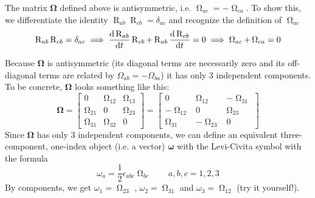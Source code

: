 \documentclass[11pt, a4paper]{article}
\newcommand{\mat}[1]{\mathbf{#1}} %
\begin{document}
\begin{itemize}
	The matrix $ \mathbf{\Omega} $ defined above is antisymmetric, i.e. $ \operatorname{\Omega}_{ac} = - \operatorname{\Omega}_{ca} $. To show this, we differentiate the identity $ \operatorname{R}_{ab}\operatorname{R}_{cb} = \delta_{a c} $ and recognize the definition of $ \operatorname{\Omega}_{ac} $
	\begin{equation*}
		\operatorname{R}_{ab}\operatorname{R}_{cb} = \delta_{a c} \implies \dv{\operatorname{R}_{ab}}{t}\operatorname{R}_{cb} + \operatorname{R}_{ab}\dv{\operatorname{R}_{cb}}{t} = 0 \implies \operatorname{\Omega}_{ac} + \operatorname{\Omega}_{ca} = 0
	\end{equation*}
	
	Because $ \mat{\Omega} $ is antisymmetric (its diagonal terms are necessarily zero and its off-diagonal terms are related by $ \Omega_{ab} = - \Omega_{ba} $) it has only 3 independent components. To be concrete, $ \mat{\Omega} $ looks something like this:
	\begin{equation*}
		\mat{\Omega} = 
		\begin{bmatrix}
			0 & \operatorname{\Omega}_{12} & \operatorname{\Omega}_{13}\\
			\operatorname{\Omega}_{21} & 0 & \operatorname{\Omega}_{23}\\
			\operatorname{\Omega}_{31} & \operatorname{\Omega}_{32} & 0
		\end{bmatrix}
		= 
		\begin{bmatrix}
			0 & \operatorname{\Omega}_{12} & - \operatorname{\Omega}_{31}\\-
			\operatorname{\Omega}_{12} & 0 & \operatorname{\Omega}_{23}\\
			\operatorname{\Omega}_{31} & -\operatorname{\Omega}_{23} & 0
		\end{bmatrix}
	\end{equation*}
	Since $ \mat{\Omega} $ has only 3 independent components, we can define an equivalent three-component, one-index object (i.e. a vector) $ \bm{\omega} $ with the Levi-Civita symbol with the formula
	\begin{equation*}
		 \omega_{a} = \frac{1}{2} \epsilon_{abc} \operatorname{\Omega}_{bc} \qquad a, b, c = 1, 2, 3
	\end{equation*}
	By components, we get $ \omega_{1} = \operatorname{\Omega}_{23}$ , $ \omega_{2} = \operatorname{\Omega}_{31} $ and $ \omega_{3} = \operatorname{\Omega}_{12} $ (try it yourself!).
	

\end{itemize}
\end{document}
